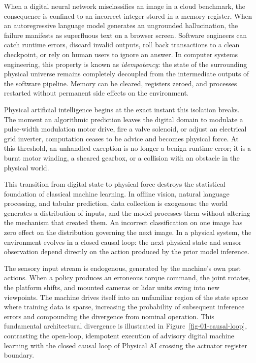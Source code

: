 \documentclass[
  10pt,
  letterpaper,
  twoside,
  openright,
  numbers=noenddot,
  headings=standardclasses
]{scrbook}
\begin{document}
When a digital neural network misclassifies an image in a cloud
benchmark, the consequence is confined to an incorrect integer stored in
a memory register. When an autoregressive language model generates an
ungrounded hallucination, the failure manifests as superfluous text on a
browser screen. Software engineers can catch runtime errors, discard
invalid outputs, roll back transactions to a clean checkpoint, or rely
on human users to ignore an answer. In computer systems engineering,
this property is known as \emph{idempotency}: the state of the
surrounding physical universe remains completely decoupled from the
intermediate outputs of the software pipeline.
Memory can be cleared, registers zeroed, and processes restarted without
permanent side effects on the environment.

Physical artificial intelligence begins at the exact instant this
isolation breaks. The moment an algorithmic prediction leaves the
digital domain to modulate a pulse-width modulation motor drive, fire a
valve solenoid, or adjust an electrical grid inverter, computation
ceases to be advice and becomes physical force. At this threshold, an
unhandled exception is no longer a benign runtime error; it is a burnt
motor winding, a sheared gearbox, or a collision with an obstacle in the
physical world.

This transition from digital state to physical force destroys the
statistical foundation of classical machine learning. In offline vision,
natural language processing, and tabular prediction, data collection is
exogenous: the world generates a distribution of inputs, and the model
processes them without altering the mechanism that created them. An
incorrect classification on one image has zero effect on the
distribution governing the next image. In a physical system, the
environment evolves in a closed causal loop: the next physical state and
sensor observation depend directly on the action produced by the prior
model inference.

The sensory input stream is endogenous, generated by the machine's own
past actions. When a policy produces an erroneous torque command, the
joint rotates, the platform shifts, and mounted cameras or lidar units
swing into new viewpoints. The machine drives itself into an unfamiliar
region of the state space where training data is sparse, increasing the
probability of subsequent inference errors and compounding the
divergence from nominal operation. This fundamental architectural
divergence is illustrated in Figure~\ref{fig-01-causal-loop},
contrasting the open-loop, idempotent execution of advisory digital
machine learning with the closed causal loop of Physical AI crossing the
actuator register boundary.
\end{document}
